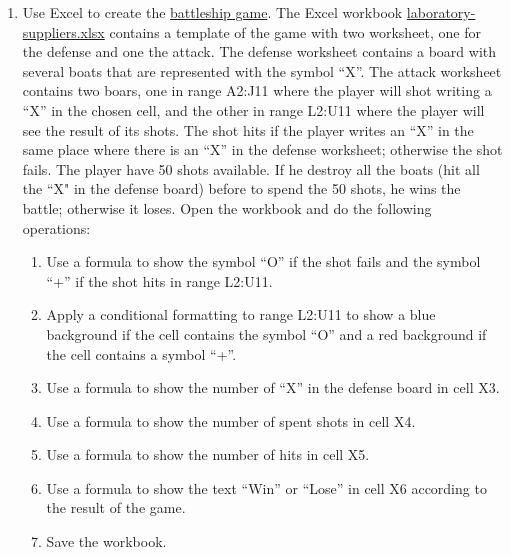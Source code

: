\begin{enumerate}[leftmargin=*,resume]
\item Use Excel to create the \href{https://en.wikipedia.org/wiki/Battleship_(game)}{battleship game}. 
The Excel workbook
\href{http://aprendeconalf.es/office/excel/exercises/formulas/laboratory-suppliers.xlsx}{\textsf{laboratory-suppliers.xlsx}}
contains a template of the game with two worksheet, one for the defense and one the attack. 
The defense worksheet contains a board with several boats that are represented with the symbol ``X''. 
The attack worksheet contains two boars, one in range A2:J11 where the player will shot writing a ``X'' in the chosen
cell, and the other in range L2:U11 where the player will see the result of its shots. 
The shot hits if the player writes an ``X'' in the same place where there is an ``X'' in the defense worksheet;
otherwise the shot fails. 
The player have 50 shots available.
If he destroy all the boats (hit all the ``X" in the defense board) before to spend the 50 shots, he wins the battle;
otherwise it loses. 
Open the workbook and do the following operations:
\begin{enumerate}
\item Use a formula to show the symbol ``O'' if the shot fails and the symbol ``+'' if the shot hits in range L2:U11.
\item Apply a conditional formatting to range L2:U11 to show a blue background if the cell contains the symbol ``O'' and
a red background if the cell contains a symbol ``+''.
\item Use a formula to show the number of ``X'' in the defense board in cell X3. 
\item Use a formula to show the number of spent shots in cell X4.
\item Use a formula to show the number of hits in cell X5.  
\item Use a formula to show the text ``Win'' or ``Lose'' in cell X6 according to the result of the game. 
\item Save the workbook.
\end{enumerate}

\end{enumerate}